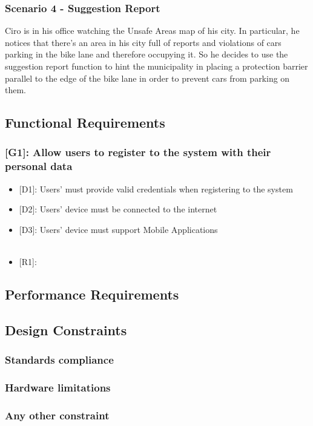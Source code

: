 \documentclass[12pt,a4paper]{article}
\begin{document}
\subsubsection*{Scenario 4 - Suggestion Report}
Ciro is in his office watching the Unsafe Areas map of his city. In particular, he notices that there's an area in his city full of reports and violations of cars parking in the bike lane and therefore occupying it. So he decides to use the suggestion report function to hint the municipality in placing a protection barrier parallel to the edge of the bike lane in order to prevent cars from parking on them.
\newpage
\subsection{Functional Requirements}
\subsubsection*{{[}{G1}{]}: Allow users to register to the system with their personal data}
\begin{itemize}
\item {[D1]}: Users' must provide valid credentials when registering to the system
\item {[D2]}: Users' device must be connected to the internet
\item {[D3]}: Users' device must support Mobile Applications
\\\\
\item {[R1]}:
\end{itemize}
\subsection{Performance Requirements}
\subsection{Design Constraints}
\subsubsection{Standards compliance}
\subsubsection{Hardware limitations}
\subsubsection{Any other constraint} 
\end{document}
